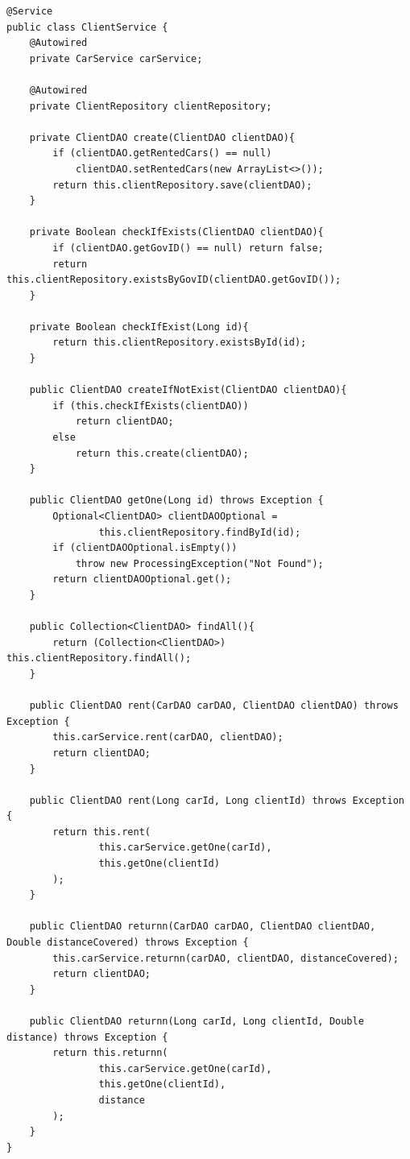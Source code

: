 \documentclass{article}
\begin{document}
        \begin{verbatim}
@Service
public class ClientService {
    @Autowired
    private CarService carService;

    @Autowired
    private ClientRepository clientRepository;

    private ClientDAO create(ClientDAO clientDAO){
        if (clientDAO.getRentedCars() == null)
            clientDAO.setRentedCars(new ArrayList<>());
        return this.clientRepository.save(clientDAO);
    }

    private Boolean checkIfExists(ClientDAO clientDAO){
        if (clientDAO.getGovID() == null) return false;
        return this.clientRepository.existsByGovID(clientDAO.getGovID());
    }

    private Boolean checkIfExist(Long id){
        return this.clientRepository.existsById(id);
    }

    public ClientDAO createIfNotExist(ClientDAO clientDAO){
        if (this.checkIfExists(clientDAO))
            return clientDAO;
        else
            return this.create(clientDAO);
    }

    public ClientDAO getOne(Long id) throws Exception {
        Optional<ClientDAO> clientDAOOptional =
                this.clientRepository.findById(id);
        if (clientDAOOptional.isEmpty())
            throw new ProcessingException("Not Found");
        return clientDAOOptional.get();
    }

    public Collection<ClientDAO> findAll(){
        return (Collection<ClientDAO>) this.clientRepository.findAll();
    }

    public ClientDAO rent(CarDAO carDAO, ClientDAO clientDAO) throws Exception {
        this.carService.rent(carDAO, clientDAO);
        return clientDAO;
    }

    public ClientDAO rent(Long carId, Long clientId) throws Exception {
        return this.rent(
                this.carService.getOne(carId),
                this.getOne(clientId)
        );
    }

    public ClientDAO returnn(CarDAO carDAO, ClientDAO clientDAO, Double distanceCovered) throws Exception {
        this.carService.returnn(carDAO, clientDAO, distanceCovered);
        return clientDAO;
    }

    public ClientDAO returnn(Long carId, Long clientId, Double distance) throws Exception {
        return this.returnn(
                this.carService.getOne(carId),
                this.getOne(clientId),
                distance
        );
    }
}
        \end{verbatim}
\end{document}
